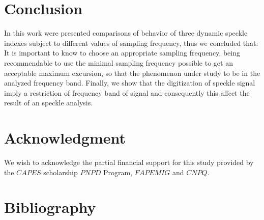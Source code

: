 \documentclass[review]{elsarticle}
\begin{document}
\section{Conclusion} 

In this work were presented comparisons of behavior of three dynamic speckle indexes
subject to different values of sampling frequency, thus we concluded that:
It is important to know to choose an appropriate sampling frequency, 
being recommendable to use the minimal sampling frequency possible to get an acceptable maximum excursion,
so that the phenomenon under study to be in the analyzed frequency band.
Finally, 
we show that the digitization  of speckle signal imply a restriction of frequency 
band of signal and consequently this affect the result of an speckle analysis.

\section{Acknowledgment}
We wish to acknowledge the partial financial support for this study provided by the $CAPES$ 
scholarship
$PNPD$ Program, $FAPEMIG$ and $CNPQ$.

\section{Bibliography}


\end{document}
